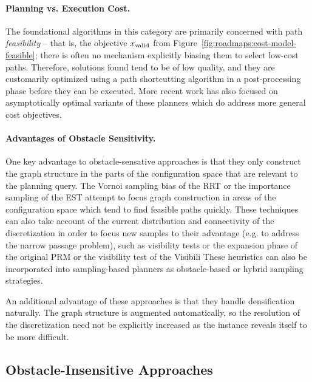 \paragraph{Planning vs. Execution Cost.}
The foundational algorithms in this category are primarily concerned
with path \emph{feasibility} -- that is, the objective $x_{\mbox{\scriptsize valid}}$
from Figure~\ref{fig:roadmaps:cost-model-feasible};
there is often no mechanism explicitly biasing them to select
low-cost paths.
Therefore, solutions found tend to be of low quality,
and they are customarily optimized using a path shortcutting
algorithm in a post-processing phase before they can be executed.
More recent work has also focused on asymptotically optimal variants
of these planners
\citep{karaman2010rrtstar, karaman2011samplingoptimal, gammell2015bitstar, hauser2015lazy}
which do address more general cost objectives.

\paragraph{Advantages of Obstacle Sensitivity.}
One key advantage to obstacle-sensative approaches is that
they only construct the graph structure in the parts of the
configuration space that are relevant to the planning query.
The Vornoi sampling bias of the RRT or the importance sampling of the EST
attempt to focus graph construction in areas of the configuration space
which tend to find feasible paths quickly.
These techniques can also take account of the current distribution
and connectivity of the discretization in order to focus new
samples to their advantage
(e.g. to address the narrow passage problem),
such as visibility tests \citep{simeon2000visibilityprms}
or the expansion phase of the original PRM
\citep{kavrakietal1996prm}
or the visibility test of the Visibili
These heuristics can also be incorporated into sampling-based planners
as obstacle-based \citep{boor1999prmgaussiansampling}
or hybrid \citep{hsu2005hybridsampling} sampling strategies.

An additional advantage of these approaches
is that they handle densification naturally.
The graph structure is augmented automatically,
so the resolution of the discretization need not be explicitly
increased as the instance reveals itself to be more difficult.


\subsection{Obstacle-Insensitive Approaches}

